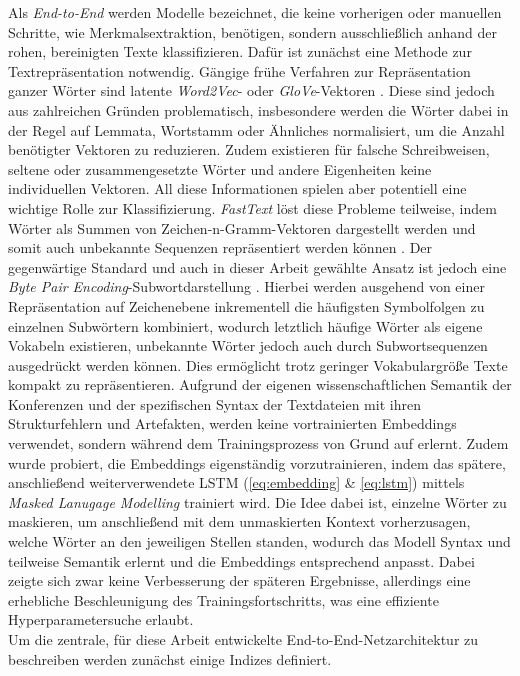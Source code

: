 \documentclass[bachelor,german]{info1thesis}
\begin{document}
Als \textit{End-to-End} werden Modelle bezeichnet, die keine vorherigen oder manuellen Schritte, wie Merkmalsextraktion, benötigen, sondern ausschließlich anhand der rohen, bereinigten Texte klassifizieren. Dafür ist zunächst eine Methode zur Textrepräsentation notwendig. Gängige frühe Verfahren zur Repräsentation ganzer Wörter sind latente \textit{Word2Vec}- oder \textit{GloVe}-Vektoren \cite{Mikolov2013,Pennington2014}. Diese sind jedoch aus zahlreichen Gründen problematisch, insbesondere werden die Wörter dabei in der Regel auf Lemmata, Wortstamm oder Ähnliches normalisiert, um die Anzahl benötigter Vektoren zu reduzieren. Zudem existieren für falsche Schreibweisen, seltene oder zusammengesetzte Wörter und andere Eigenheiten keine individuellen Vektoren. All diese Informationen spielen aber potentiell eine wichtige Rolle zur Klassifizierung. \textit{FastText} löst diese Probleme teilweise, indem Wörter als Summen von Zeichen-n-Gramm-Vektoren dargestellt werden und somit auch unbekannte Sequenzen repräsentiert werden können \cite{Bojanowski2016}. Der gegenwärtige Standard und auch in dieser Arbeit gewählte Ansatz ist jedoch eine \textit{Byte Pair Encoding}-Subwortdarstellung \cite{Sennrich2015}. Hierbei werden ausgehend von einer Repräsentation auf Zeichenebene inkrementell die häufigsten Symbolfolgen zu einzelnen Subwörtern kombiniert, wodurch letztlich häufige Wörter als eigene Vokabeln existieren, unbekannte Wörter jedoch auch durch Subwortsequenzen ausgedrückt werden können. Dies ermöglicht trotz geringer Vokabulargröße Texte kompakt zu repräsentieren. Aufgrund der eigenen wissenschaftlichen Semantik der Konferenzen und der spezifischen Syntax der Textdateien mit ihren Strukturfehlern und Artefakten, werden keine vortrainierten Embeddings verwendet, sondern während dem Trainingsprozess von Grund auf erlernt. Zudem wurde probiert, die Embeddings eigenständig vorzutrainieren, indem das spätere, anschließend weiterverwendete LSTM (\autoref{eq:embedding} \& \ref{eq:lstm}) mittels \textit{Masked Lanugage Modelling} trainiert wird. Die Idee dabei ist, einzelne Wörter zu maskieren, um anschließend mit dem unmaskierten Kontext vorherzusagen, welche Wörter an den jeweiligen Stellen standen, wodurch das Modell Syntax und teilweise Semantik erlernt und die Embeddings entsprechend anpasst. Dabei zeigte sich zwar keine Verbesserung der späteren Ergebnisse, allerdings eine erhebliche Beschleunigung des Trainingsfortschritts, was eine effiziente Hyperparametersuche erlaubt. \\
Um die zentrale, für diese Arbeit entwickelte End-to-End-Netzarchitektur zu beschreiben werden zunächst einige Indizes definiert.
\end{document}
